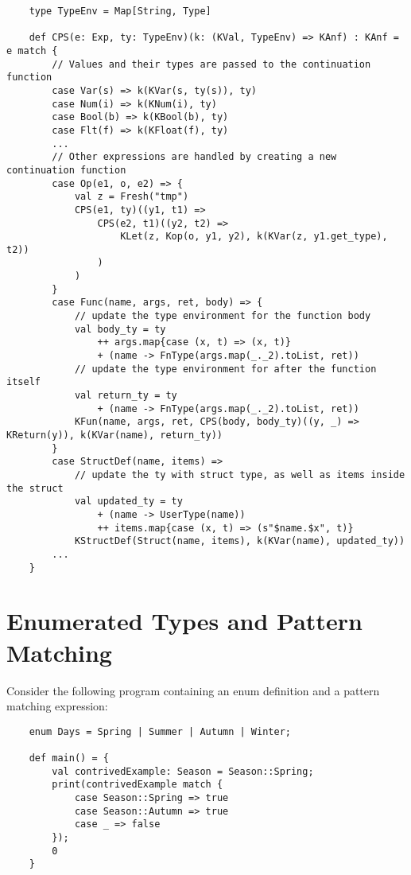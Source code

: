 \begin{verbatim}
    type TypeEnv = Map[String, Type]

    def CPS(e: Exp, ty: TypeEnv)(k: (KVal, TypeEnv) => KAnf) : KAnf = e match {
        // Values and their types are passed to the continuation function
        case Var(s) => k(KVar(s, ty(s)), ty)
        case Num(i) => k(KNum(i), ty)
        case Bool(b) => k(KBool(b), ty)
        case Flt(f) => k(KFloat(f), ty)
        ...
        // Other expressions are handled by creating a new continuation function
        case Op(e1, o, e2) => {
            val z = Fresh("tmp")
            CPS(e1, ty)((y1, t1) =>
                CPS(e2, t1)((y2, t2) =>
                    KLet(z, Kop(o, y1, y2), k(KVar(z, y1.get_type), t2))
                )
            )
        }
        case Func(name, args, ret, body) => {
            // update the type environment for the function body
            val body_ty = ty
                ++ args.map{case (x, t) => (x, t)}
                + (name -> FnType(args.map(_._2).toList, ret))
            // update the type environment for after the function itself
            val return_ty = ty
                + (name -> FnType(args.map(_._2).toList, ret))
            KFun(name, args, ret, CPS(body, body_ty)((y, _) => KReturn(y)), k(KVar(name), return_ty))
        }
        case StructDef(name, items) =>
            // update the ty with struct type, as well as items inside the struct
            val updated_ty = ty
                + (name -> UserType(name))
                ++ items.map{case (x, t) => (s"$name.$x", t)}
            KStructDef(Struct(name, items), k(KVar(name), updated_ty))
        ...
    }
\end{verbatim}

\section{Enumerated Types and Pattern Matching}


Consider the following program containing an enum definition and a pattern matching expression:

\begin{verbatim}
    enum Days = Spring | Summer | Autumn | Winter;

    def main() = {
        val contrivedExample: Season = Season::Spring;
        print(contrivedExample match {
            case Season::Spring => true
            case Season::Autumn => true
            case _ => false
        });
        0
    }
\end{verbatim}

